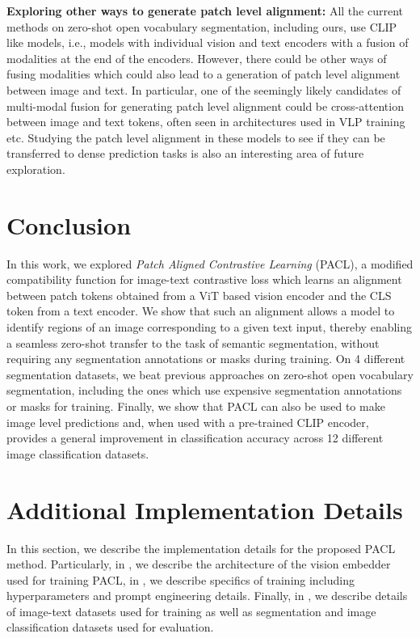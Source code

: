 \documentclass[10pt,twocolumn,letterpaper]{article}
\begin{document}
\textbf{Exploring other ways to generate patch level alignment:} All the current methods on zero-shot open vocabulary segmentation, including ours, use CLIP like models, i.e., models with individual vision and text encoders with a fusion of modalities at the end of the encoders. However, there could be other ways of fusing modalities which could also lead to a generation of patch level alignment between image and text. In particular, one of the seemingly likely candidates of multi-modal fusion for generating patch level alignment could be cross-attention between image and text tokens, often seen in architectures used in VLP training \cite{kim2021vilt, li2021align, singh2022flava} etc. Studying the patch level alignment in these models to see if they can be transferred to dense prediction tasks is also an interesting area of future exploration. 

\section{Conclusion}
In this work, we explored \emph{Patch Aligned Contrastive Learning} (PACL), a modified compatibility function for image-text contrastive loss which learns an alignment between patch tokens obtained from a ViT based vision encoder and the CLS token from a text encoder. We show that such an alignment allows a model to identify regions of an image corresponding to a given text input, thereby enabling a seamless zero-shot transfer to the task of semantic segmentation, without requiring any segmentation annotations or masks during training. On 4 different segmentation datasets, we beat previous approaches on zero-shot open vocabulary segmentation, including the ones which use expensive segmentation annotations or masks for training. Finally, we show that PACL can also be used to make image level predictions and, when used with a pre-trained CLIP encoder, provides a general improvement in classification accuracy across 12 different image classification datasets.

{\small


}

\clearpage
\appendix


\section{Additional Implementation Details}
\label{app:additional_implementation_details}

In this section, we describe the implementation details for the proposed PACL method. Particularly, in , we describe the architecture of the vision embedder used for training PACL, in , we describe specifics of training including hyperparameters and prompt engineering details. Finally, in , we describe details of image-text datasets used for training as well as segmentation and image classification datasets used for evaluation.
\end{document}
